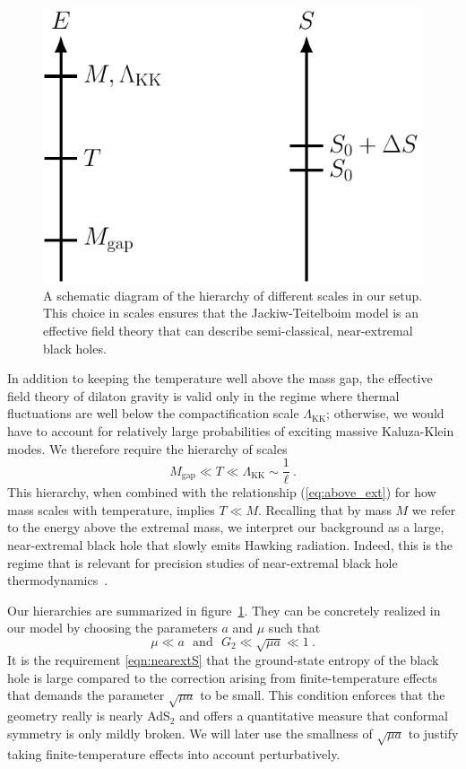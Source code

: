 \documentclass[12pt]{article}
\begin{document}
\begin{figure}[ht]\centering
	\includegraphics[scale = 0.7]{Images/hierarchy4.pdf}
	\caption{A schematic diagram of the hierarchy of different scales in our setup.  This choice in scales ensures that the Jackiw-Teitelboim model is an effective field theory that can describe semi-classical, near-extremal black holes.}
	\label{fig:scales}
\end{figure}

In addition to keeping the temperature well above the mass gap, the effective field theory of dilaton gravity is valid only in the regime where thermal fluctuations are well below the compactification scale $\Lambda_\text{KK}$; otherwise, we would have to account for relatively large probabilities of exciting massive Kaluza-Klein modes.  We therefore require the hierarchy of scales 
\begin{equation}
	M_\text{gap} \ll T \ll \Lambda_\text{KK} \sim \frac{1}{\ell}~.
	\label{eqn:hier1}
\end{equation}
This hierarchy, when combined with the relationship (\ref{eq:above_ext}) for how mass scales with temperature, implies $T \ll M$. Recalling that by mass $M$ we refer to the energy above the extremal mass, we interpret our background as a large, near-extremal black hole that slowly emits Hawking radiation. Indeed, this is the regime that is relevant for precision studies of near-extremal black hole thermodynamics~\cite{Castro:2009jf,Pathak:2016vfc,Castro:2018ffi}.  


Our hierarchies are summarized in figure~\ref{fig:scales}. They can be concretely realized in our model by choosing the parameters $a$ and $\mu$ such that
\begin{equation}
	\mu \ll a\,\,\,\,\text{and}\,\,\,\, G_2 \ll \sqrt{\mu a} \ll 1~.
	\label{eqn:hier2}
\end{equation}
It is the requirement \eqref{eqn:nearextS} that the ground-state entropy of the black hole is large compared to the correction arising from finite-temperature effects 
that demands the parameter $\sqrt{\mu a}$ to be small. This condition enforces that the geometry really is nearly AdS$_2$  and offers a quantitative measure that conformal symmetry is only mildly broken. We will later use the smallness of $\sqrt{\mu a}$ to justify taking finite-temperature effects into account 
perturbatively. 
\end{document}

